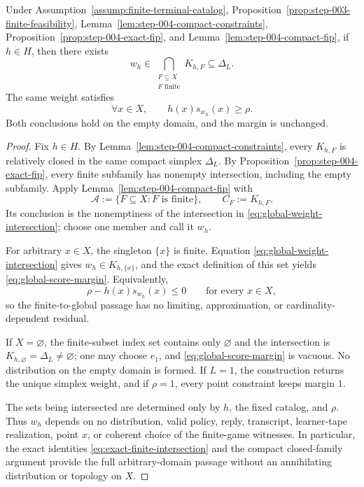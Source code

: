 \begin{proposition}
\label{prop:step-004-global-weight}
Under Assumption~\ref{assump:finite-terminal-catalog},
Proposition~\ref{prop:step-003-finite-feasibility},
Lemma~\ref{lem:step-004-compact-constraints},
Proposition~\ref{prop:step-004-exact-fip}, and
Lemma~\ref{lem:step-004-compact-fip}, if $h\in H$, then there exists
\begin{equation}\label{eq:global-weight-intersection}
w_h\in
\bigcap_{\substack{F\subseteq X\\F\text{ finite}}}K_{h,F}
\subseteq\Delta_L.
\end{equation}
The same weight satisfies
\begin{equation}\label{eq:global-score-margin}
\forall x\in X,\qquad h(x)s_{w_h}(x)\ge\rho.
\end{equation}
Both conclusions hold on the empty domain, and the margin is unchanged.
\end{proposition}

\begin{proof}
Fix $h\in H$.  By Lemma~\ref{lem:step-004-compact-constraints}, every
$K_{h,F}$ is relatively closed in the same compact simplex $\Delta_L$.
By Proposition~\ref{prop:step-004-exact-fip}, every finite subfamily has
nonempty intersection, including the empty subfamily.  Apply
Lemma~\ref{lem:step-004-compact-fip} with
\[
\mathcal A:=\{F\subseteq X:F\text{ is finite}\},
\qquad C_F:=K_{h,F}.
\]
Its conclusion is the nonemptiness of the intersection in
\eqref{eq:global-weight-intersection}; choose one member and call it $w_h$.

For arbitrary $x\in X$, the singleton $\{x\}$ is finite.  Equation
\eqref{eq:global-weight-intersection} gives
$w_h\in K_{h,\{x\}}$, and the exact definition of this set yields
\eqref{eq:global-score-margin}.  Equivalently,
\[
\rho-h(x)s_{w_h}(x)\le0
\qquad\text{for every }x\in X,
\]
so the finite-to-global passage has no limiting, approximation, or
cardinality-dependent residual.

If $X=\varnothing$, the finite-subset index set contains only
$\varnothing$ and the intersection is
$K_{h,\varnothing}=\Delta_L\ne\varnothing$; one may choose $e_1$, and
\eqref{eq:global-score-margin} is vacuous.  No distribution on the empty
domain is formed.  If $L=1$, the construction returns the unique simplex
weight, and if $\rho=1$, every point constraint keeps margin $1$.

The sets being intersected are determined only by $h$, the fixed catalog,
and $\rho$.  Thus $w_h$ depends on no distribution, valid policy, reply,
transcript, learner-tape realization, point $x$, or coherent choice of the
finite-game witnesses.  In particular, the exact identities
\eqref{eq:exact-finite-intersection} and the compact closed-family argument
provide the full arbitrary-domain passage without an annihilating
distribution or topology on $X$.
\end{proof}

